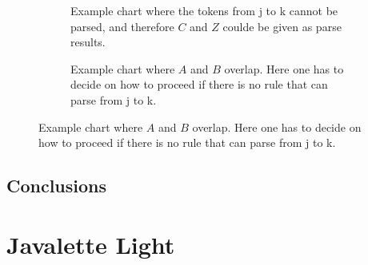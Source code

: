 \documentclass[a4paper,12pt,twosided]{report}
\newcommand{\subt}[3] { 
  \draw[grid] (#1,#1) -- (#1,#2) node[inChart] {#3} -- (#2,#2);
  \fill[color=black] (#1,#2) circle (2pt)
 }
\newcommand{\mrk}[2]{\node[inChart] at (#1,#1) {#2}}
\begin{document}
\begin{figure}[H]
  \centering
  \begin{subfigure}[H]{.4\textwidth}
    \flushleft
     \caption{\label{missingglue}Example chart where the tokens from j to k
     cannot be parsed, and therefore $C$ and $Z$ coulde be given as parse
     results.}
  \end{subfigure}
  \begin{subfigure}[H]{.1\textwidth}
  \text{}
  \end{subfigure}
  \begin{subfigure}[H]{.4\textwidth}
    \flushright
    \caption{\label{parseoverlap} Example chart where $A$ and $B$ overlap. Here one
    has to decide on how to proceed if there is no rule that can parse from j to
    k.}
  \end{subfigure}
\end{figure}

\section{Conclusions}

%
%




%
%

\appendix
\chapter{Javalette Light}
\end{document}

